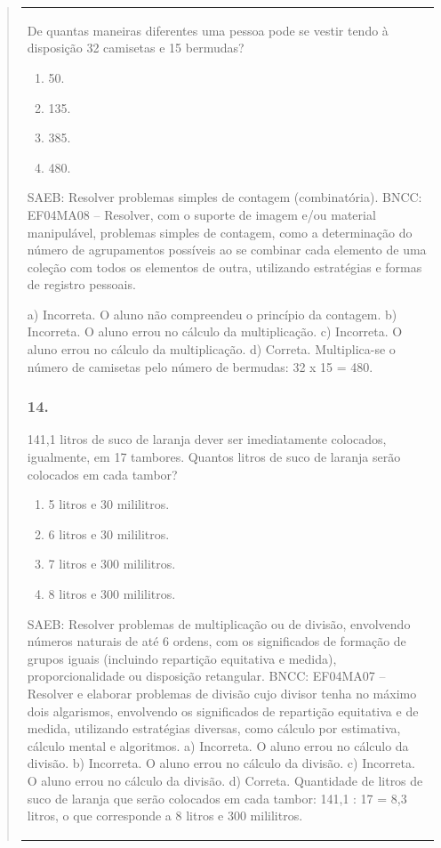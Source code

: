\begin{mdframed}[linewidth=2pt,linecolor=salmao,roundcorner=2pt]
\begin{itemize}
{\begin{itemize}
\begin{escolha}
{\begin{quote}
{\begin{escolha}
{{{{{\begin{longtable}[]{@{}l@{}}
\begin{itemize}
{De quantas maneiras diferentes uma pessoa pode se vestir tendo à
disposição 32 camisetas e 15 bermudas?

\begin{enumerate}
\item
  50.
\item
  135.
\item
  385.
\item
  480.
\end{enumerate}

SAEB: Resolver problemas simples de contagem (combinatória).
BNCC: EF04MA08 -- Resolver, com o suporte de imagem e/ou material manipulável, problemas simples
de contagem, como a determinação do número de agrupamentos possíveis ao se combinar cada
elemento de uma coleção com todos os elementos de outra, utilizando estratégias e formas de
registro pessoais.

a) Incorreta. O aluno não compreendeu o princípio da contagem.
b) Incorreta. O aluno errou no cálculo da multiplicação.
c) Incorreta. O aluno errou no cálculo da multiplicação.
d) Correta. Multiplica-se o número de camisetas pelo número de bermudas: 32 x 15 = 480.

\subsubsection{14.}

141,1 litros de suco de laranja dever ser imediatamente colocados,
igualmente, em 17 tambores. Quantos litros de suco de laranja serão
colocados em cada tambor?

\begin{enumerate}
\item
  5 litros e 30 mililitros.
\item
  6 litros e 30 mililitros.
\item
  7 litros e 300 mililitros.
\item
  8 litros e 300 mililitros.
\end{enumerate}

SAEB: Resolver problemas de multiplicação ou de divisão,
envolvendo números naturais de até 6 ordens, com os significados de
formação de grupos iguais (incluindo repartição equitativa e medida),
proporcionalidade ou disposição retangular.
BNCC: EF04MA07 -- Resolver e elaborar problemas de divisão cujo divisor tenha no máximo dois algarismos,
envolvendo os significados de repartição equitativa e de medida, utilizando estratégias diversas,
como cálculo por estimativa, cálculo mental e algoritmos.
a) Incorreta. O aluno errou no cálculo da divisão.
b) Incorreta. O aluno errou no cálculo da divisão.
c) Incorreta. O aluno errou no cálculo da divisão.
d) Correta. Quantidade de litros de suco de laranja que serão colocados em cada
tambor: 141,1 : 17 = 8,3 litros, o que corresponde a 8 litros e 300 mililitros.

}
\end{itemize}
\end{longtable}}}}}}
\end{escolha}}
\end{quote}}
\end{escolha}
\end{itemize}}
\end{itemize}
\end{mdframed}
